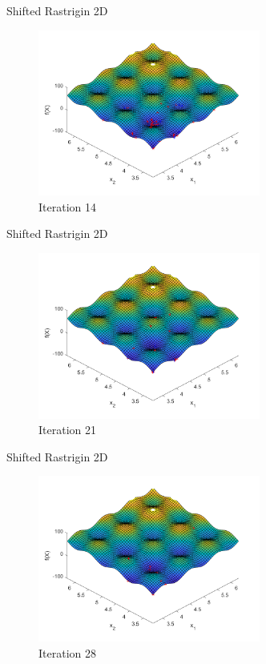 \documentclass[xcolor=table]{beamer}
\begin{document}
\begin{frame}{Shifted Rastrigin 2D}
  \begin{figure}[h]
  \begin{center}
    \includegraphics[width=0.65\textwidth]{img/smpl/rast2dshft/loa-iter-14}
    \caption{Iteration 14}
  \end{center}
  \end{figure}
\end{frame}
\begin{frame}{Shifted Rastrigin 2D}
  \begin{figure}[h]
  \begin{center}
    \includegraphics[width=0.65\textwidth]{img/smpl/rast2dshft/loa-iter-21}
    \caption{Iteration 21}
  \end{center}
  \end{figure}
\end{frame}
\begin{frame}{Shifted Rastrigin 2D}
  \begin{figure}[h]
  \begin{center}
    \includegraphics[width=0.65\textwidth]{img/smpl/rast2dshft/loa-iter-28}
    \caption{Iteration 28}
  \end{center}
  \end{figure}
\end{frame}
\end{document}
